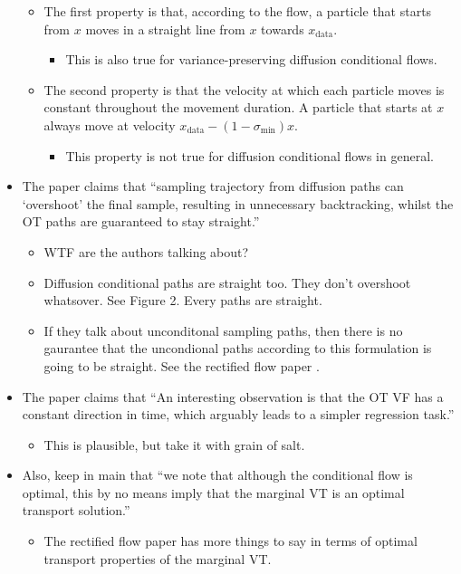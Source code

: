 \documentclass[10pt]{article}
\newcommand{\data}{\mathrm{data}}
\begin{document}
\begin{itemize}
\begin{itemize}
    \item The first property is that, according to the flow, a particle that starts from $x$ moves in a straight line from $x$ towards $x_{\data}$.
    \begin{itemize}
      \item This is also true for variance-preserving diffusion conditional flows.
    \end{itemize}

    \item The second property is that the velocity at which each particle moves is constant throughout the movement duration. A particle that starts at $x$ always move at velocity $x_{\data} - (1-\sigma_{\min}) x$.
    \begin{itemize}
      \item This property is not true for diffusion conditional flows in general.
    \end{itemize}
  \end{itemize}
  
  \item The paper claims that ``sampling trajectory from diffusion paths can `overshoot' the final sample, resulting in unnecessary backtracking, whilst the OT paths are guaranteed to stay straight.''
  \begin{itemize}
    \item WTF are the authors talking about?
    \item Diffusion conditional paths are straight too. They don't overshoot whatsover. See Figure 2. Every paths are straight.
    \item If they talk about unconditonal sampling paths, then there is no gaurantee that the uncondional paths according to this formulation is going to be straight. See the rectified flow paper \cite{Liu:2022}.
  \end{itemize}

  \item The paper claims that ``An interesting observation is that the OT VF has a constant direction in time, which arguably leads to a simpler regression task.''
  \begin{itemize}
    \item This is plausible, but take it with grain of salt.
  \end{itemize}

  \item Also, keep in main that ``we note that although the conditional flow is optimal, this by no means imply that the marginal VT is an optimal transport solution.''
  \begin{itemize}
    \item The rectified flow paper \cite{Liu:2022} has more things to say in terms of optimal transport properties of the marginal VT.
  \end{itemize}
\end{itemize}
\end{document}
